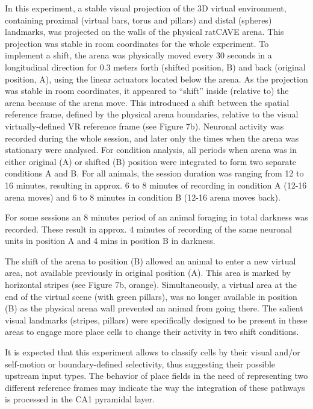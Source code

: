 In this experiment, a stable visual projection of the 3D virtual environment, containing proximal (virtual bars, torus and pillars) and distal (spheres) landmarks, was projected on the walls of the physical ratCAVE arena. This projection was stable in room coordinates for the whole experiment. To implement a shift, the arena was physically moved every 30 seconds in a longitudinal direction for 0.3 meters forth (shifted position, B) and back (original position, A), using the linear actuators located below the arena. As the projection was stable in room coordinates, it appeared to “shift” inside (relative to) the arena because of the arena move. This introduced a shift between the spatial reference frame, defined by the physical arena boundaries, relative to the visual virtually-defined VR reference frame (see Figure 7b). Neuronal activity was recorded during the whole session, and later only the times when the arena was stationary were analysed. For condition analysis, all periods when arena was in either original (A) or shifted (B) position were integrated to form two separate conditions A and B. For all animals, the session duration was ranging from 12 to 16 minutes, resulting in approx. 6 to 8 minutes of recording in condition A (12-16 arena moves) and 6 to 8 minutes in condition B (12-16 arena moves back).

For some sessions an 8 minutes period of an animal foraging in total darkness was recorded. These result in approx. 4 minutes of recording of the same neuronal units in position A and 4 mins in position B in darkness.

The shift of the arena to position (B) allowed an animal to enter a new virtual area, not available previously in original position (A). This area is marked by horizontal stripes (see Figure 7b, orange). Simultaneously, a virtual area at the end of the virtual scene (with green pillars), was no longer available in position (B) as the physical arena wall prevented an animal from going there. The salient visual landmarks (stripes, pillars) were specifically designed to be present in these areas to engage more place cells to change their activity in two shift conditions.

It is expected that this experiment allows to classify cells by their visual and/or self-motion or boundary-defined selectivity, thus suggesting their possible upstream input types. The behavior of place fields in the need of representing two different reference frames may indicate the way the integration of these pathways is processed in the CA1 pyramidal layer.


